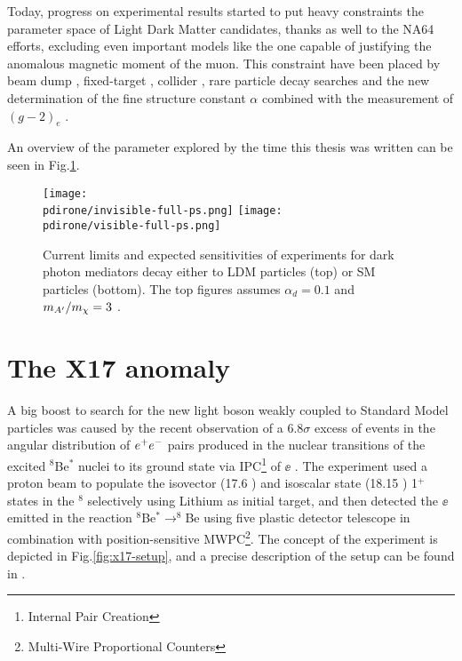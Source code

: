 Today, progress on experimental results started to put heavy constraints the parameter space of Light Dark Matter candidates, thanks as well to the NA64 efforts, excluding even important models like the one capable of justifying the anomalous magnetic moment of the muon. This constraint have been placed by beam dump \cite{jdb, charm, PhysRevLett.59.755, e137, konaka, PhysRevLett.67.2942, dav,  ath, nomad, e787, essig1, blum,sg1, blum1, sarah1}, fixed-target \cite{apex,merkel,merkel1}, collider \cite{babar, curt, babar1}, rare particle decay searches \cite{sindrum, kloe, sg2, kloe2, wasa, hades, phenix, e949, na48, pol, kloe3} and the new determination of the fine structure constant $\alpha$ combined with the measurement of $(g-2)_e$ \cite{Parker191,PhysRevLett.100.120801}.

An overview of the parameter explored by the time this thesis was written can be seen in Fig.\ref{fig:dmplane-overview}.

\begin{figure}[bth!]
  \centering
  \texttt{[image: \\pdirone/invisible-full-ps.png]}
  \texttt{[image: \\pdirone/visible-full-ps.png]}
  \caption[Current exclusion limit and project for Dark Photon in the physics community]{Current limits and expected sensitivities of experiments for dark photon mediators decay either to LDM particles (top) or SM particles (bottom). The top figures assumes $\alpha_d = 0.1$ and $m_{A'}/m_{\chi} = 3$ \cite{pbc-book}.}
  \label{fig:dmplane-overview}
\end{figure}  

\section{The X17 anomaly}
\label{ch1:sec:dm-u1model-motivations-x17}

A big boost to search for the new light boson weakly coupled to Standard Model particles was caused by the recent observation of a 6.8$\sigma$ excess of events in the angular distribution of $e^+e^-$ pairs produced in the nuclear transitions of the excited $^8$Be$^*$ nuclei to its ground state via IPC\footnote{Internal Pair Creation} of $\ee$ \cite{Krasznahorkay:2015iga}. The experiment used a proton beam to populate the isovector (17.6 \mev) and isoscalar state (18.15 \mev) 1$^+$ states in the $^8$ selectively using Lithium as initial target, and then detected the $\ee$ emitted in the reaction $^8$Be$^* \to ^8$Be using five plastic detector telescope in combination with position-sensitive MWPC\footnote{Multi-Wire Proportional Counters}. The concept of the experiment is depicted in Fig.\ref{fig:x17-setup}, and a precise description of the setup can be found in \cite{GULYAS201621}.

